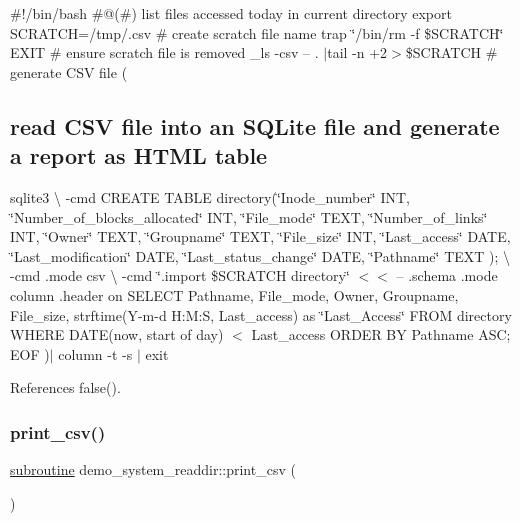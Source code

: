 \#!/bin/bash \#@(\#) list files accessed today in current directory export S\+C\+R\+A\+T\+CH=/tmp/.csv \# create scratch file name trap \char`\"{}/bin/rm -\/f \$\+S\+C\+R\+A\+T\+C\+H\char`\"{} E\+X\+IT \# ensure scratch file is removed \+\_\+ls -\/csv -- . $\vert$tail -\/n +2$>$\$\+S\+C\+R\+A\+T\+CH \# generate C\+SV file ( \subsection*{read C\+SV file into an S\+Q\+Lite file and generate a report as H\+T\+ML table}

sqlite3 \textbackslash{} -\/cmd \textquotesingle{}C\+R\+E\+A\+TE T\+A\+B\+LE directory(\char`\"{}\+Inode\+\_\+number\char`\"{} I\+NT, \char`\"{}\+Number\+\_\+of\+\_\+blocks\+\_\+allocated\char`\"{} I\+NT, \char`\"{}\+File\+\_\+mode\char`\"{} T\+E\+XT, \char`\"{}\+Number\+\_\+of\+\_\+links\char`\"{} I\+NT, \char`\"{}\+Owner\char`\"{} T\+E\+XT, \char`\"{}\+Groupname\char`\"{} T\+E\+XT, \char`\"{}\+File\+\_\+size\char`\"{} I\+NT, \char`\"{}\+Last\+\_\+access\char`\"{} D\+A\+TE, \char`\"{}\+Last\+\_\+modification\char`\"{} D\+A\+TE, \char`\"{}\+Last\+\_\+status\+\_\+change\char`\"{} D\+A\+TE, \char`\"{}\+Pathname\char`\"{} T\+E\+XT );\textquotesingle{} \textbackslash{} -\/cmd \textquotesingle{}.mode csv\textquotesingle{} \textbackslash{} -\/cmd \char`\"{}.\+import \$\+S\+C\+R\+A\+T\+C\+H directory\char`\"{} $<$$<$ -- .schema .mode column .header on S\+E\+L\+E\+CT Pathname, File\+\_\+mode, Owner, Groupname, File\+\_\+size, strftime(\textquotesingle{}Y-\/m-\/d H\+:M\+:S\textquotesingle{}, Last\+\_\+access) as \char`\"{}\+Last\+\_\+\+Access\char`\"{} F\+R\+OM directory W\+H\+E\+RE D\+A\+TE(\textquotesingle{}now\textquotesingle{}, \textquotesingle{}start of day\textquotesingle{}) $<$ Last\+\_\+access O\+R\+D\+ER BY Pathname A\+SC; E\+OF )$\vert$ column -\/t -\/s \textquotesingle{}$\vert$\textquotesingle{} exit 

References false().

\mbox{\label{__ls_8f90_a4299f4bb3561e562301b7fed91e7c673}} 
\subsubsection{\texorpdfstring{print\+\_\+csv()}{print\_csv()}}
{\footnotesize\ttfamily \hyperlink{M__stopwatch_83_8txt_acfbcff50169d691ff02d4a123ed70482}{subroutine} demo\+\_\+system\+\_\+readdir\+::print\+\_\+csv (\begin{DoxyParamCaption}{ }\end{DoxyParamCaption})}



